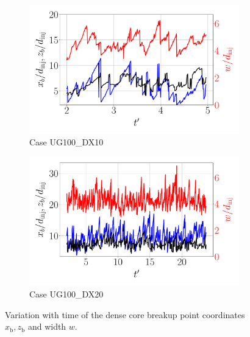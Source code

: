 \begin{figure}[ht]
\begin{subfigure}[b]{0.45\textwidth}
	\centering
   \includegraphics[scale=0.25]{./part2_developments/figures_ch5_resolved_JICF/results_dense_core_modeling/instant_xb_zb_w_UG100_DX10}
   \caption{Case UG100\_DX10}
   \label{fig:instant_xb_zb_w_UG100_DX10} 
\end{subfigure}
\hfill
\begin{subfigure}[b]{0.45\textwidth}
	\centering
   \includegraphics[scale=0.25]{./part2_developments/figures_ch5_resolved_JICF/results_dense_core_modeling/instant_xb_zb_w_UG100_DX20}
   \caption{Case UG100\_DX20}
   \label{fig:instant_xb_zb_w_UG100_DX20}
\end{subfigure}
   \caption{Variation with time of the dense core breakup point coordinates $x_\mathrm{b}, z_\mathrm{b}$ and width $w$.}

\label{fig:JICF_xb_zb_w_evolution}
\end{figure}


